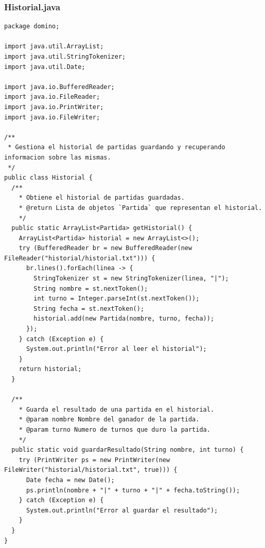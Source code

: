 \documentclass[12pt]{article}
\begin{document}
  \subsubsection{Historial.java}
  \begin{lstlisting}
package domino;

import java.util.ArrayList;
import java.util.StringTokenizer;
import java.util.Date;

import java.io.BufferedReader;
import java.io.FileReader;
import java.io.PrintWriter;
import java.io.FileWriter;

/**
 * Gestiona el historial de partidas guardando y recuperando informacion sobre las mismas.
 */
public class Historial {
  /**
    * Obtiene el historial de partidas guardadas.
    * @return Lista de objetos `Partida` que representan el historial.
    */
  public static ArrayList<Partida> getHistorial() {
    ArrayList<Partida> historial = new ArrayList<>();
    try (BufferedReader br = new BufferedReader(new FileReader("historial/historial.txt"))) {
      br.lines().forEach(linea -> {
        StringTokenizer st = new StringTokenizer(linea, "|");
        String nombre = st.nextToken();
        int turno = Integer.parseInt(st.nextToken());
        String fecha = st.nextToken();
        historial.add(new Partida(nombre, turno, fecha));
      });
    } catch (Exception e) {
      System.out.println("Error al leer el historial");
    }
    return historial;
  }

  /**
    * Guarda el resultado de una partida en el historial.
    * @param nombre Nombre del ganador de la partida.
    * @param turno Numero de turnos que duro la partida.
    */
  public static void guardarResultado(String nombre, int turno) {
    try (PrintWriter ps = new PrintWriter(new FileWriter("historial/historial.txt", true))) {
      Date fecha = new Date();
      ps.println(nombre + "|" + turno + "|" + fecha.toString());
    } catch (Exception e) {
      System.out.println("Error al guardar el resultado");
    }
  }
}
  \end{lstlisting}  
\end{document}

